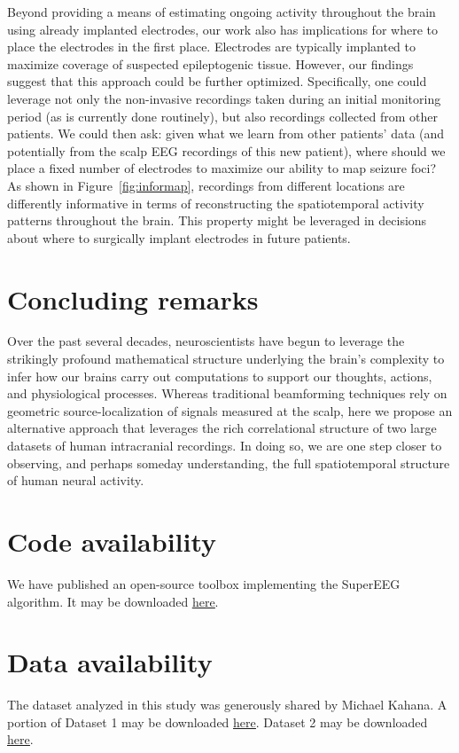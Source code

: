 \message{ !name(main.tex)}\documentclass[11pt]{article}
\begin{document}
{Beyond providing a means of estimating ongoing activity throughout the
brain using already implanted electrodes, our work also has
implications for where to place the electrodes in the first place.
Electrodes are typically implanted to maximize coverage of suspected
epileptogenic tissue.  However, our findings suggest that this
approach could be further optimized.  Specifically, one could leverage
not only the non-invasive recordings taken during an initial
monitoring period (as is currently done routinely), but also
recordings collected from other patients.  We could then ask: given
what we learn from other patients' data (and potentially from the
scalp EEG recordings of this new patient), where should we place a
fixed number of electrodes to maximize our ability to map seizure
foci?  As shown in Figure~\ref{fig:informap}, recordings from
different locations are differently informative in terms of
reconstructing the spatiotemporal activity patterns throughout the
brain.  This property might be leveraged in decisions about where to
surgically implant electrodes in future patients.

\section*{Concluding remarks}
Over the past several decades, neuroscientists have begun to leverage
the strikingly profound mathematical structure underlying the brain's
complexity to infer how our brains carry out computations to support
our thoughts, actions, and physiological processes.  Whereas
traditional beamforming techniques rely on geometric
source-localization of signals measured at the scalp, here we propose
an alternative approach that leverages the rich correlational
structure of two large datasets of human intracranial recordings.  In
doing so, we are one step closer to observing, and perhaps
someday understanding, the full spatiotemporal structure of human
neural activity.

\section*{Code availability}
We have published an open-source toolbox implementing the SuperEEG
algorithm.  It may be downloaded \href{https://supereeg.readthedocs.io/en/latest/}{\underline{here}}.

\section*{Data availability}
The dataset analyzed in this study was generously shared by Michael Kahana.  A portion of Dataset 1 may be downloaded
\href{http://memory.psych.upenn.edu/Request_EEG_access?paper=SedeEtal03}{\underline{here}}.
Dataset 2 may be downloaded
\href{http://memory.psych.upenn.edu/Request_EEG_access?paper=EzzyEtal17}{\underline{here}}.

}
\end{document}
